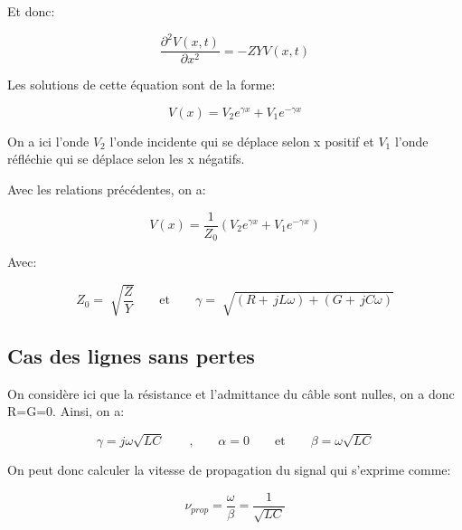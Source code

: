 \documentclass[12pt,a4paper, french]{article}
\begin{document}
    Et donc:
    \begin{center}
    \begin{equation*}
            \frac{\partial^2V(x,t)}{\partial x^{2}}=-ZYV(x,t)
    \end{equation*}
    \end{center}
    
    Les solutions de cette équation sont de la forme:
    \begin{center}
    \begin{equation*}
                V(x)=V_{2}e^{\gamma x}+V_{1}e^{-\gamma x}
    \end{equation*}
    \end{center}
    
    On a ici l’onde $V_{2}$ l’onde incidente qui se déplace selon x positif et $V_{1}$ l’onde réfléchie qui se déplace selon les x négatifs. 
    \newpage  
    
    Avec les relations précédentes, on a:
    \begin{center}
        \begin{equation*}
                    V(x)=\frac{1}{Z_{0}}(V_{2}e^{\gamma x}+V_{1}e^{-\gamma x})
    \end{equation*}
    \end{center}
        
    Avec:
    \begin{center}
    \begin{equation*}
        Z_{0}=\sqrt[]{\frac{Z}{Y}}\qquad\text{et}\qquad\gamma = \sqrt[]{(R+\,j L\omega)+(G+\,j C\omega )}
    \end{equation*}
    \end{center}
    
    \subsection{Cas des lignes sans pertes}
    
    On considère ici que la résistance et l'admittance du câble sont nulles, on a donc R=G=0. Ainsi, on a:
    \begin{center}
    \begin{equation*}
        \gamma = j\omega \sqrt{LC}\qquad\text{,}\qquad\alpha =0\qquad\text{et}\qquad\beta =\omega \sqrt{LC}   
    \end{equation*}
    \end{center}
    
    On peut donc calculer la vitesse de propagation du signal qui s’exprime comme:
    \begin{center}
    \begin{equation*}
        \nu_{prop}=\frac{\omega }{\beta }=\frac{1}{\sqrt{LC}}
    \end{equation*}
    \end{center}
    
\end{document}
